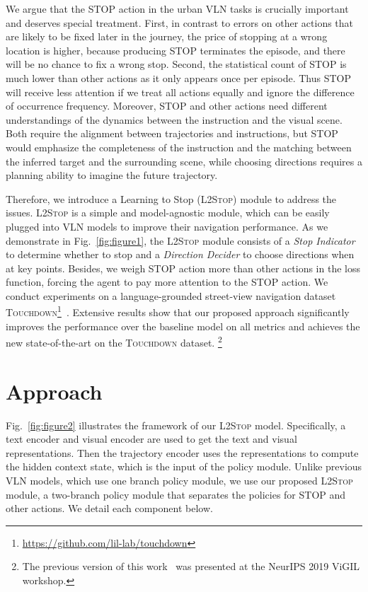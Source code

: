 \documentclass[11pt,a4paper]{article}
\begin{document}
We argue that the STOP action in the urban VLN tasks is crucially important and deserves special treatment.
First, in contrast to errors on other actions that are likely to be fixed later in the journey, the price of stopping at a wrong location is higher, because producing STOP terminates the episode, and there will be no chance to fix a wrong stop. 
Second, the statistical count of STOP is much lower than other actions as it only appears once per episode. Thus STOP will receive less attention if we treat all actions equally and ignore the difference of occurrence frequency.
Moreover, STOP and other actions need different understandings of the dynamics between the instruction and the visual scene. Both require the alignment between trajectories and instructions, 
but STOP would emphasize the completeness of the instruction and the matching between the inferred target and the surrounding scene, while choosing directions requires a planning ability to imagine the future trajectory.

Therefore, we introduce a Learning to Stop (\textsc{L2Stop}) module to address the issues. \textsc{L2Stop} is a simple and model-agnostic module, which can be easily plugged into VLN models to improve their navigation performance. As we demonstrate in Fig.~\ref{fig:figure1}, the \textsc{L2Stop} module consists of a \textit{Stop Indicator} to determine whether to stop and a \textit{Direction Decider} to choose directions when at key points. Besides, we weigh STOP action more than other actions in the loss function, forcing the agent to pay more attention to the STOP action.
 We conduct experiments on a language-grounded street-view navigation dataset \textsc{Touchdown}\footnote{\url{https://github.com/lil-lab/touchdown}}~\citep{chen2019touchdown}.
Extensive results show that our proposed approach significantly improves the performance over the baseline model on all metrics and achieves the new state-of-the-art on the \textsc{Touchdown} dataset. 
\footnote{The previous version of this work~\cite{xiang2019not} was presented at the NeurIPS 2019 ViGIL workshop.}

\section{Approach}
\label{sec:approach}
Fig.~\ref{fig:figure2} illustrates the framework of our \textsc{L2Stop} model. Specifically, a text encoder and visual encoder are used to get the text and visual representations. Then the trajectory encoder uses the representations to compute the hidden context state, which is the input of the policy module. Unlike previous VLN models, which use one branch policy module, we use our proposed \textsc{L2Stop} module, a two-branch policy module that separates the policies for STOP and other actions. We detail each component below.
\end{document}
